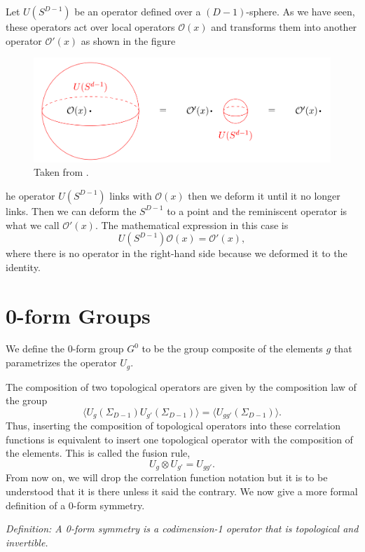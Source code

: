 \documentclass{article}
\begin{document}
Let   $U(S^{D-1})$ be an operator defined over a $(D-1)$-sphere.  As we have seen, these operators act over local operators $\mathcal{O}(x)$ and transforms them into another operator $\mathcal{O}'(x)$  as shown in the figure
\begin{figure}[h]
\centering
\includegraphics[scale=0.4]{figures/linking.png}
\caption{Taken from \cite{Bhardwaj}.}
\end{figure}
he operator $U(S^{D-1})$ links with $\mathcal{O}(x)$ then we deform it until it no longer links. Then we can deform the $S^{D-1}$ to a point and the reminiscent operator is what we call $\mathcal{O}'(x).$ The mathematical expression in this case is 
$$
U(S^{D-1})\mathcal{O}(x)=\mathcal{O}'(x),
$$
where there is no operator in the right-hand side because we deformed it to the identity. 
\section*{0-form Groups}
We define the 0-form group $G^{0}$ to be the group composite of the elements $g$ that parametrizes the operator $U_g.$

The composition of two topological operators are given by the composition law of the group
$$\langle U_g(\Sigma_{D-1})U_{g'}(\Sigma_{D-1})\rangle=\langle U_{gg'}(\Sigma_{D-1})\rangle.$$
Thus, inserting the composition of topological operators into these correlation functions is equivalent to insert one topological operator with the composition of the elements. This is called the fusion rule,
$$
U_g\otimes U_{g'}=U_{gg'}.
$$
From now on, we will drop the correlation function notation but it is to be understood that it is there unless it said the contrary.  We now give a more formal definition of a 0-form symmetry. 

\textit{Definition: A 0-form symmetry is a codimension-1 operator that is topological and invertible. }
\end{document}
